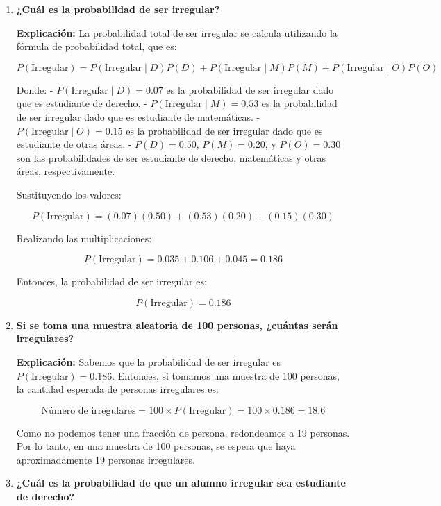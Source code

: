 \documentclass[titlepage]{article} %
\begin{document}
\begin{enumerate}
    \item \textbf{¿Cuál es la probabilidad de ser irregular?}
    
    \textbf{Explicación:}  
    La probabilidad total de ser irregular se calcula utilizando la fórmula de probabilidad total, que es:
    
    \[
    P(\text{Irregular}) = P(\text{Irregular} \mid D) P(D) + P(\text{Irregular} \mid M) P(M) + P(\text{Irregular} \mid O) P(O)
    \]
    
    Donde:
    - \(P(\text{Irregular} \mid D) = 0.07\) es la probabilidad de ser irregular dado que es estudiante de derecho.
    - \(P(\text{Irregular} \mid M) = 0.53\) es la probabilidad de ser irregular dado que es estudiante de matemáticas.
    - \(P(\text{Irregular} \mid O) = 0.15\) es la probabilidad de ser irregular dado que es estudiante de otras áreas.
    - \(P(D) = 0.50\), \(P(M) = 0.20\), y \(P(O) = 0.30\) son las probabilidades de ser estudiante de derecho, matemáticas y otras áreas, respectivamente.
    
    Sustituyendo los valores:
    
    \[
    P(\text{Irregular}) = (0.07)(0.50) + (0.53)(0.20) + (0.15)(0.30)
    \]
    
    Realizando las multiplicaciones:
    
    \[
    P(\text{Irregular}) = 0.035 + 0.106 + 0.045 = 0.186
    \]
    
    Entonces, la probabilidad de ser irregular es:
    
    \[
    P(\text{Irregular}) = 0.186
    \]

    \item \textbf{Si se toma una muestra aleatoria de 100 personas, ¿cuántas serán irregulares?}
    
    \textbf{Explicación:}  
    Sabemos que la probabilidad de ser irregular es \( P(\text{Irregular}) = 0.186 \). Entonces, si tomamos una muestra de 100 personas, la cantidad esperada de personas irregulares es:
    
    \[
    \text{Número de irregulares} = 100 \times P(\text{Irregular}) = 100 \times 0.186 = 18.6
    \]
    
    Como no podemos tener una fracción de persona, redondeamos a 19 personas. Por lo tanto, en una muestra de 100 personas, se espera que haya aproximadamente 19 personas irregulares.

    \item \textbf{¿Cuál es la probabilidad de que un alumno irregular sea estudiante de derecho?}
    

\end{enumerate}
\end{document}
